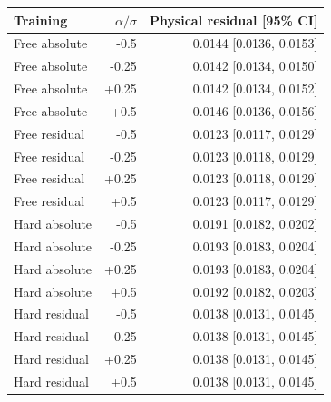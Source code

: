 \begin{tabular}{lrr}
\toprule
Training & $\alpha/\sigma$ & Physical residual [95\% CI] \\
\midrule
Free absolute & -0.5 & 0.0144 [0.0136, 0.0153] \\
Free absolute & -0.25 & 0.0142 [0.0134, 0.0150] \\
Free absolute & +0.25 & 0.0142 [0.0134, 0.0152] \\
Free absolute & +0.5 & 0.0146 [0.0136, 0.0156] \\
Free residual & -0.5 & 0.0123 [0.0117, 0.0129] \\
Free residual & -0.25 & 0.0123 [0.0118, 0.0129] \\
Free residual & +0.25 & 0.0123 [0.0118, 0.0129] \\
Free residual & +0.5 & 0.0123 [0.0117, 0.0129] \\
Hard absolute & -0.5 & 0.0191 [0.0182, 0.0202] \\
Hard absolute & -0.25 & 0.0193 [0.0183, 0.0204] \\
Hard absolute & +0.25 & 0.0193 [0.0183, 0.0204] \\
Hard absolute & +0.5 & 0.0192 [0.0182, 0.0203] \\
Hard residual & -0.5 & 0.0138 [0.0131, 0.0145] \\
Hard residual & -0.25 & 0.0138 [0.0131, 0.0145] \\
Hard residual & +0.25 & 0.0138 [0.0131, 0.0145] \\
Hard residual & +0.5 & 0.0138 [0.0131, 0.0145] \\
\bottomrule
\end{tabular}
